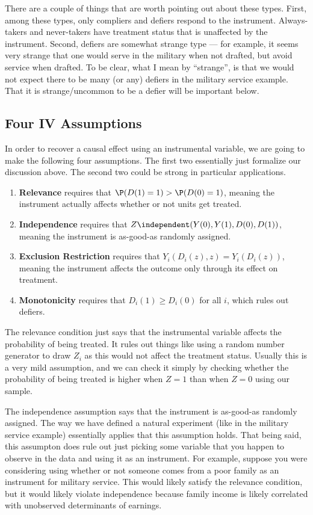 \documentclass[
  letterpaper,
  DIV=11,
  numbers=noendperiod]{scrreprt}
\begin{document}
There are a couple of things that are worth pointing out about these
types. First, among these types, only compliers and defiers respond to
the instrument. Always-takers and never-takers have treatment status
that is unaffected by the instrument. Second, defiers are somewhat
strange type --- for example, it seems very strange that one would serve
in the military when not drafted, but avoid service when drafted. To be
clear, what I mean by ``strange'', is that we would not expect there to
be many (or any) defiers in the military service example. That it is
strange/uncommon to be a defier will be important below.

\subsection{Four IV Assumptions}\label{four-iv-assumptions}

In order to recover a causal effect using an instrumental variable, we
are going to make the following four assumptions. The first two
essentially just formalize our discussion above. The second two could be
strong in particular applications.

\begin{enumerate}
\def\labelenumi{\arabic{enumi}.}
\item
  \textbf{Relevance} requires that \(\P(D(1)=1) > \P(D(0)=1)\), meaning
  the instrument actually affects whether or not units get treated.
\item
  \textbf{Independence} requires that
  \(Z \independent (Y(0), Y(1), D(0), D(1))\), meaning the instrument is
  as-good-as randomly assigned.
\item
  \textbf{Exclusion Restriction} requires that
  \(Y_i(D_i(z),z) = Y_i(D_i(z))\), meaning the instrument affects the
  outcome only through its effect on treatment.
\item
  \textbf{Monotonicity} requires that \(D_i(1) \geq D_i(0)\) for all
  \(i\), which rules out defiers.
\end{enumerate}

The relevance condition just says that the instrumental variable affects
the probability of being treated. It rules out things like using a
random number generator to draw \(Z_i\) as this would not affect the
treatment status. Usually this is a very mild assumption, and we can
check it simply by checking whether the probability of being treated is
higher when \(Z=1\) than when \(Z=0\) using our sample.

The independence assumption says that the instrument is as-good-as
randomly assigned. The way we have defined a natural experiment (like in
the military service example) essentially applies that this assumption
holds. That being said, this assumpton does rule out just picking some
variable that you happen to observe in the data and using it as an
instrument. For example, suppose you were considering using whether or
not someone comes from a poor family as an instrument for military
service. This would likely satisfy the relevance condition, but it would
likely violate independence because family income is likely correlated
with unobserved determinants of earnings.
\end{document}
